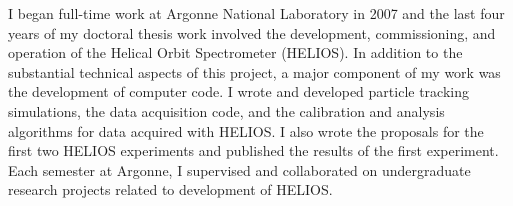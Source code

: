{I began full-time work at Argonne National Laboratory in %
 2007 and the last four years of my doctoral thesis work involved the
 development, commissioning, and operation of the Helical Orbit Spectrometer (HELIOS).
In addition to the substantial technical aspects of this project,
 a major component of my work was the development of computer code. %
I wrote and developed particle tracking simulations, %
 the data acquisition code, and %
 the calibration and analysis algorithms for data acquired with HELIOS. 
 I also wrote the proposals for the first two HELIOS experiments and published the results of the first experiment.
Each semester at Argonne, I supervised and collaborated on undergraduate research projects related to development of HELIOS.

}
